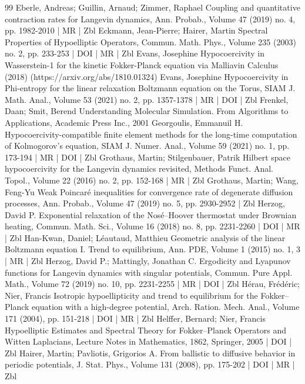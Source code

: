 \documentclass[10pt]{amsart}
\theoremstyle{definition}\newtheorem{defi}[theo]{Definition}\newtheorem{rema}[theo]{Remark}\newtheorem{exam}[theo]{Example}\newtheorem{exem}[theo]{Example}\newtheorem{nota}[theo]{Notation}
\begin{document}
\begin{thebibliography}{99}
Eberle, Andreas; Guillin, Arnaud; Zimmer, Raphael Coupling and quantitative contraction rates for Langevin dynamics, Ann. Probab., Volume 47 (2019) no. 4, pp. 1982-2010 | MR | Zbl
Eckmann, Jean-Pierre; Hairer, Martin Spectral Properties of Hypoelliptic Operators, Commun. Math. Phys., Volume 235 (2003) no. 2, pp. 233-253 | DOI | MR | Zbl
Evans, Josephine Hypocoercivity in Wasserstein-1 for the kinetic Fokker-Planck equation via Malliavin Calculus (2018) (https://arxiv.org/abs/1810.01324)
Evans, Josephine Hypocoercivity in Phi-entropy for the linear relaxation Boltzmann equation on the Torus, SIAM J. Math. Anal., Volume 53 (2021) no. 2, pp. 1357-1378 | MR | DOI | Zbl
Frenkel, Daan; Smit, Berend Understanding Molecular Simulation. From Algorithms to Applications, Academic Press Inc., 2001
Georgoulis, Emmanuil H. Hypocoercivity-compatible finite element methods for the long-time computation of Kolmogorov’s equation, SIAM J. Numer. Anal., Volume 59 (2021) no. 1, pp. 173-194 | MR | DOI | Zbl
Grothaus, Martin; Stilgenbauer, Patrik Hilbert space hypocoercivity for the Langevin dynamics revisited, Methods Funct. Anal. Topol., Volume 22 (2016) no. 2, pp. 152-168 | MR | Zbl
Grothaus, Martin; Wang, Feng-Yu Weak Poincaré inequalities for convergence rate of degenerate diffusion processes, Ann. Probab., Volume 47 (2019) no. 5, pp. 2930-2952 | Zbl
Herzog, David P. Exponential relaxation of the Nosé–Hoover thermostat under Brownian heating, Commun. Math. Sci., Volume 16 (2018) no. 8, pp. 2231-2260 | DOI | MR | Zbl
Han-Kwan, Daniel; Léautaud, Matthieu Geometric analysis of the linear Boltzmann equation I. Trend to equilibrium, Ann. PDE, Volume 1 (2015) no. 1, 3 | MR | Zbl
Herzog, David P.; Mattingly, Jonathan C. Ergodicity and Lyapunov functions for Langevin dynamics with singular potentials, Commun. Pure Appl. Math., Volume 72 (2019) no. 10, pp. 2231-2255 | MR | DOI | Zbl
Hérau, Frédéric; Nier, Francis Isotropic hypoellipticity and trend to equilibrium for the Fokker–Planck equation with a high-degree potential, Arch. Ration. Mech. Anal., Volume 171 (2004), pp. 151-218 | DOI | MR | Zbl
Helffer, Bernard; Nier, Francis Hypoelliptic Estimates and Spectral Theory for Fokker–Planck Operators and Witten Laplacians, Lecture Notes in Mathematics, 1862, Springer, 2005 | DOI | Zbl
Hairer, Martin; Pavliotis, Grigorios A. From ballistic to diffusive behavior in periodic potentials, J. Stat. Phys., Volume 131 (2008), pp. 175-202 | DOI | MR | Zbl

\end{thebibliography}
\end{document}
